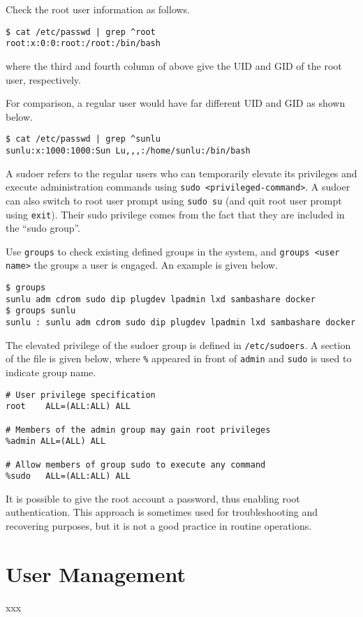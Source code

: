 Check the root user information as follows.
\begin{lstlisting}
$ cat /etc/passwd | grep ^root
root:x:0:0:root:/root:/bin/bash
\end{lstlisting}
where the third and fourth column of above give the UID and GID of the root user, respectively.

For comparison, a regular user would have far different UID and GID as shown below.
\begin{lstlisting}
$ cat /etc/passwd | grep ^sunlu
sunlu:x:1000:1000:Sun Lu,,,:/home/sunlu:/bin/bash
\end{lstlisting}

A sudoer refers to the regular users who can temporarily elevate its privileges and execute administration commands using \verb|sudo <privileged-command>|. A sudoer can also switch to root user prompt using \verb|sudo su| (and quit root user prompt using \verb|exit|). Their sudo privilege comes from the fact that they are included in the ``sudo group''.

Use \verb|groups| to check existing defined groups in the system, and \verb|groups <user name>| the groups a user is engaged. An example is given below.
\begin{lstlisting}
$ groups
sunlu adm cdrom sudo dip plugdev lpadmin lxd sambashare docker
$ groups sunlu
sunlu : sunlu adm cdrom sudo dip plugdev lpadmin lxd sambashare docker
\end{lstlisting}

The elevated privilege of the sudoer group is defined in \verb|/etc/sudoers|. A section of the file is given below, where \verb|%| appeared in front of \verb|admin| and \verb|sudo| is used to indicate group name.
\begin{lstlisting}
# User privilege specification
root	ALL=(ALL:ALL) ALL

# Members of the admin group may gain root privileges
%admin ALL=(ALL) ALL

# Allow members of group sudo to execute any command
%sudo	ALL=(ALL:ALL) ALL
\end{lstlisting}

It is possible to give the root account a password, thus enabling root authentication. This approach is sometimes used for troubleshooting and recovering purposes, but it is not a good practice in routine operations.

\section{User Management}

xxx
















